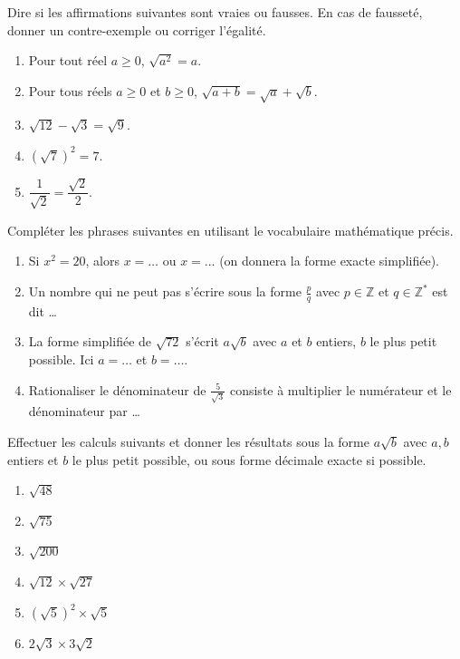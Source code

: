 \documentclass[11pt]{article}
\begin{document}
\begin{exercice}
Dire si les affirmations suivantes sont vraies ou fausses. En cas de fausseté, donner un contre-exemple ou corriger l'égalité.
\begin{enumerate}
    \item Pour tout réel $a \ge 0$, $\sqrt{a^2} = a$.
    \item Pour tous réels $a \ge 0$ et $b \ge 0$, $\sqrt{a+b} = \sqrt{a} + \sqrt{b}$.
    \item $\sqrt{12} - \sqrt{3} = \sqrt{9}$.
    \item $(\sqrt{7})^2 = 7$.
    \item $\dfrac{1}{\sqrt{2}} = \dfrac{\sqrt{2}}{2}$.
\end{enumerate}
\end{exercice}

\begin{exercice}
Compléter les phrases suivantes en utilisant le vocabulaire mathématique précis.
\begin{enumerate}
    \item Si $x^2 = 20$, alors $x = \dots$ ou $x = \dots$ (on donnera la forme exacte simplifiée).
    \item Un nombre qui ne peut pas s'écrire sous la forme $\frac{p}{q}$ avec $p \in \mathbb{Z}$ et $q \in \mathbb{Z}^*$ est dit \dots
    \item La forme simplifiée de $\sqrt{72}$ s'écrit $a\sqrt{b}$ avec $a$ et $b$ entiers, $b$ le plus petit possible. Ici $a = \dots$ et $b = \dots$.
    \item Rationaliser le dénominateur de $\frac{5}{\sqrt{3}}$ consiste à multiplier le numérateur et le dénominateur par \dots
\end{enumerate}
\end{exercice}

\begin{exercice}
Effectuer les calculs suivants et donner les résultats sous la forme $a\sqrt{b}$ avec $a,b$ entiers et $b$ le plus petit possible, ou sous forme décimale exacte si possible.
\begin{enumerate}
    \item $\sqrt{48}$
    \item $\sqrt{75}$
    \item $\sqrt{200}$
    \item $\sqrt{12} \times \sqrt{27}$
    \item $(\sqrt{5})^2 \times \sqrt{5}$
    \item $2\sqrt{3} \times 3\sqrt{2}$
\end{enumerate}
\end{exercice}
\end{document}
